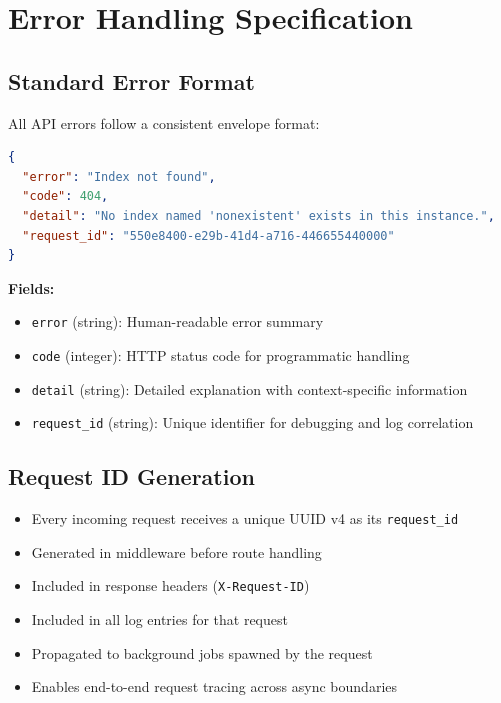 \documentclass[11pt,a4paper]{article}
\newcommand{\inlinecode}[1]{\texttt{\small\colorbox{ctCodeBg}{#1}}}
\begin{document}
\section{Error Handling Specification}

\subsection{Standard Error Format}

All API errors follow a consistent envelope format:

\begin{lstlisting}[language=JSON,title={Standard Error Response}]
{
  "error": "Index not found",
  "code": 404,
  "detail": "No index named 'nonexistent' exists in this instance.",
  "request_id": "550e8400-e29b-41d4-a716-446655440000"
}
\end{lstlisting}

\textbf{Fields:}
\begin{itemize}
    \item \inlinecode{error} (string): Human-readable error summary
    \item \inlinecode{code} (integer): HTTP status code for programmatic handling
    \item \inlinecode{detail} (string): Detailed explanation with context-specific information
    \item \inlinecode{request\_id} (string): Unique identifier for debugging and log correlation
\end{itemize}

\subsection{Request ID Generation}

\begin{itemize}
    \item Every incoming request receives a unique UUID v4 as its \inlinecode{request\_id}
    \item Generated in middleware before route handling
    \item Included in response headers (\inlinecode{X-Request-ID})
    \item Included in all log entries for that request
    \item Propagated to background jobs spawned by the request
    \item Enables end-to-end request tracing across async boundaries
\end{itemize}
\end{document}
